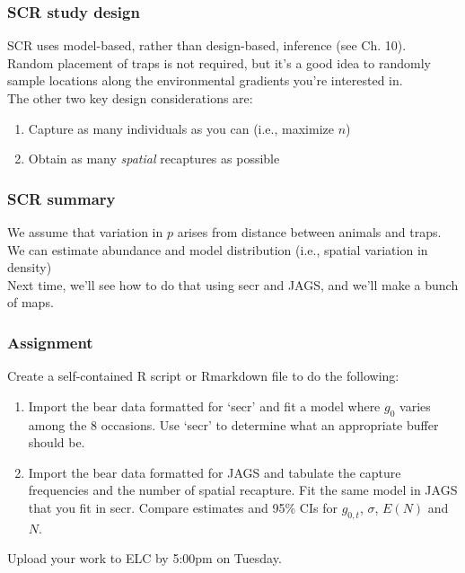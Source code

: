 \documentclass[color=usenames,dvipsnames]{beamer}\usepackage[]{graphicx}\usepackage[]{xcolor}
\begin{document}
\begin{frame}
  \frametitle{SCR study design}
  SCR uses model-based, rather than design-based,
  inference (see Ch. 10). \\ 
  \pause
  \vfill
  Random placement of traps is not required, but it's a good idea to
  randomly sample locations along the environmental gradients you're
  interested in. \\
  \pause \vfill
  The other two key design considerations are:
  \begin{enumerate}
    \item<3-> Capture as many individuals as you can (i.e., maximize $n$)
    \item<4-> Obtain as many {\it spatial} recaptures as possible
  \end{enumerate}
  \vfill
\end{frame}



\begin{frame}
  \frametitle{SCR summary}
  We assume that variation in $p$ arises from distance between animals
  and traps. \\
  \pause \vfill
  We can estimate abundance and model distribution (i.e., spatial
  variation in density) \\
  \pause \vfill
  Next time, we'll see how to do that using secr and JAGS, and we'll
  make a bunch of maps. \\
\end{frame}








\begin{frame}[fragile]
  \frametitle{Assignment}
  Create a self-contained R script or Rmarkdown file to do the
  following: 
  \vfill
  \begin{enumerate}
    \item Import the bear data formatted for `secr' and fit a model
      where $g_0$ varies among the 8 occasions. Use `secr' to
      determine what an appropriate buffer should be.
    \item Import the bear data formatted for JAGS and tabulate the
      capture frequencies and the number of spatial recapture. Fit the
      same model in JAGS that you fit in secr. Compare estimates and 95\% CIs
      for $g_{0,t}$, $\sigma$, $E(N)$ and $N$.  
  \end{enumerate}
  \vfill
  Upload your work to ELC by 5:00pm on Tuesday. 
\end{frame}
\end{document}
